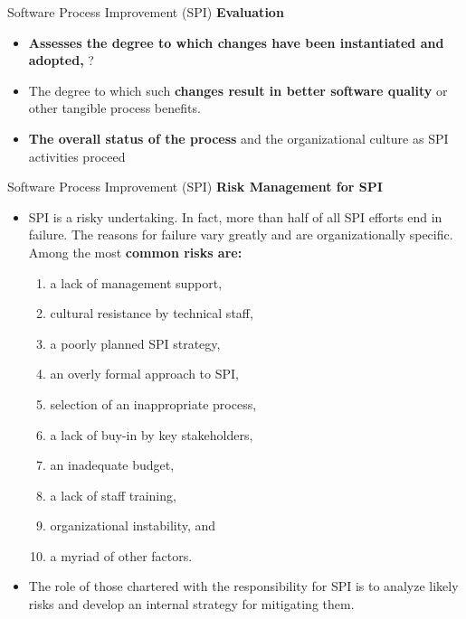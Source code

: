 \documentclass{beamer}
\begin{document}
\begin{frame}{Software Process Improvement (SPI)}
	\textbf{Evaluation}
	\begin{itemize}
		\item \textbf{Assesses the degree to which changes have been instantiated and adopted,} ?
		\item The degree to which such \textbf{changes result in better software quality }or other tangible process benefits.
		\item \textbf{The overall status of the process} and the organizational culture as SPI activities proceed
	\end{itemize}
\end{frame}
\begin{frame}{Software Process Improvement (SPI)}
	\textbf{Risk Management for SPI}
	\begin{itemize}
		\item SPI is a risky undertaking. In fact, more than half of all SPI efforts end in failure. The reasons for failure vary greatly and are organizationally specific. Among the most \textbf{common risks are: }
		\begin{enumerate}
			\item a lack of management support, 
			\item cultural resistance by technical staff, 
			\item a poorly planned SPI strategy, 
			\item an overly formal approach to SPI,
			\item selection of an inappropriate process, 
			\item a lack of buy-in by key stakeholders, 
			\item an inadequate budget, 
			\item a lack of staff training, 
			\item organizational instability, and 
			\item a myriad of other factors. 
		\end{enumerate}
	\item The role of those chartered with the responsibility for SPI is to analyze likely risks and develop an internal strategy for mitigating them.
	\end{itemize}
\end{frame}
\end{document}
